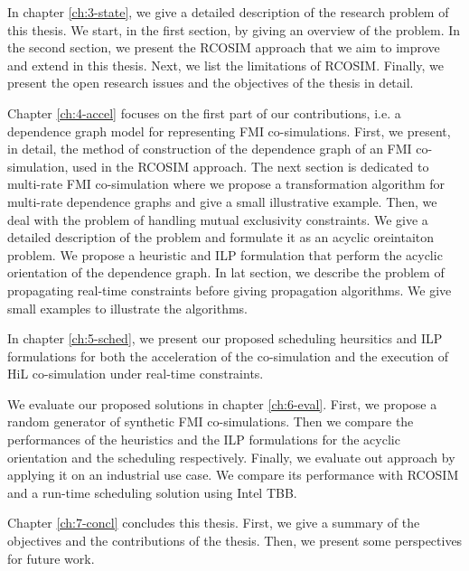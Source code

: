 In chapter \ref{ch:3-state}, we give a detailed description of the research problem of this thesis. We start, in the first section, by giving an overview of the problem. In the second section, we present the RCOSIM approach that we aim to improve and extend in this thesis. Next, we list the limitations of RCOSIM. Finally, we present the open research issues and the objectives of the thesis in detail.

Chapter \ref{ch:4-accel} focuses on the first part of our contributions, i.e. a dependence graph model for representing FMI co-simulations. First, we present, in detail, the method of construction of the dependence graph of an FMI co-simulation, used in the RCOSIM approach. The next section is dedicated to multi-rate FMI co-simulation where we propose a transformation algorithm for multi-rate dependence graphs and give a small illustrative example. Then, we deal with the problem of handling mutual exclusivity constraints. We give a detailed description of the problem and formulate it as an acyclic oreintaiton problem. We propose a heuristic and ILP formulation that perform the acyclic orientation of the dependence graph. In lat section, we describe the problem of propagating real-time constraints before giving propagation algorithms. We give small examples to illustrate the algorithms.

In chapter \ref{ch:5-sched}, we present our proposed scheduling heursitics and ILP formulations for both the acceleration of the co-simulation and the execution of HiL co-simulation under real-time constraints.

We evaluate our proposed solutions in chapter \ref{ch:6-eval}. First, we propose a random generator of synthetic FMI co-simulations. Then we compare the performances of the heuristics and the ILP formulations for the acyclic orientation and the scheduling respectively. Finally, we evaluate out approach by applying it on an industrial use case. We compare its performance with RCOSIM and a run-time scheduling solution using Intel TBB.

Chapter \ref{ch:7-concl} concludes this thesis. First, we give a summary of the objectives and the contributions of the thesis. Then, we present some perspectives for future work. 
